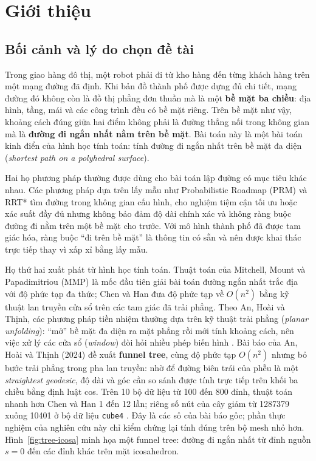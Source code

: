 
\section{Giới thiệu}\label{sec:intro}

\subsection{Bối cảnh và lý do chọn đề tài}

Trong giao hàng đô thị, một robot phải đi từ kho hàng đến từng khách hàng trên
một mạng đường đã định. Khi bản đồ thành phố được dựng đủ chi tiết, mạng đường
đó không còn là đồ thị phẳng đơn thuần mà là một \textbf{bề mặt ba chiều}: địa
hình, tầng, mái và các công trình đều có bề mặt riêng. Trên bề mặt như vậy,
khoảng cách đúng giữa hai điểm không phải là đường thẳng nối trong không gian mà
là \textbf{đường đi ngắn nhất nằm trên bề mặt}. Bài toán này là một bài toán kinh
điển của hình học tính toán: tính đường đi ngắn nhất trên bề mặt đa diện
(\emph{shortest path on a polyhedral surface}).

Hai họ phương pháp thường được dùng cho bài toán lập đường có mục tiêu khác nhau.
Các phương pháp dựa trên lấy mẫu như Probabilistic Roadmap (PRM)
và RRT* tìm đường trong không gian cấu
hình, cho nghiệm tiệm cận tối ưu hoặc xác suất đầy đủ nhưng không bảo đảm độ dài
chính xác và không ràng buộc đường đi nằm trên một bề mặt cho trước. Với mô hình
thành phố đã được tam giác hóa, ràng buộc ``đi trên bề mặt'' là thông tin có sẵn
và nên được khai thác trực tiếp thay vì xấp xỉ bằng lấy mẫu.

Họ thứ hai xuất phát từ hình học tính toán. Thuật toán của Mitchell, Mount và
Papadimitriou (MMP) là mốc đầu tiên giải bài toán đường ngắn nhất trắc địa với
độ phức tạp đa thức; Chen và Han đưa độ phức tạp về $O(n^2)$ bằng kỹ thuật lan
truyền cửa sổ trên các tam giác đã trải phẳng.
Theo An, Hoài và Thịnh, các phương pháp tiền nhiệm thường dựa trên kỹ thuật
trải phẳng (\emph{planar unfolding}): ``mở'' bề mặt đa diện ra mặt phẳng rồi mới
tính khoảng cách, nên việc xử lý các cửa sổ (\emph{window}) đòi hỏi nhiều phép
biến hình \cite{an2024funnel}. Bài báo của An, Hoài và Thịnh (2024) đề xuất
\textbf{funnel tree}, cùng độ phức tạp $O(n^2)$ nhưng bỏ bước trải phẳng trong pha lan truyền:
nhờ để đường biên trái của phễu là một \emph{straightest geodesic}, độ dài và góc
cần so sánh được tính trực tiếp trên khối ba chiều bằng định luật cos. Trên 10 bộ
dữ liệu từ 100 đến 800 đỉnh, thuật toán nhanh hơn Chen và Han 1 đến 12 lần; riêng
số nút của cây giảm từ \num{1287379} xuống \num{10401} ở bộ dữ liệu
\texttt{cube4} \cite{an2024funnel}. Đây là các số của bài báo gốc; phần thực
nghiệm của nghiên cứu này chỉ kiểm chứng lại tính đúng trên bộ mesh nhỏ hơn.
Hình~\ref{fig:tree-icosa} minh họa một funnel
tree: đường đi ngắn nhất từ đỉnh nguồn $s=0$ đến các đỉnh khác trên mặt
icosahedron.

